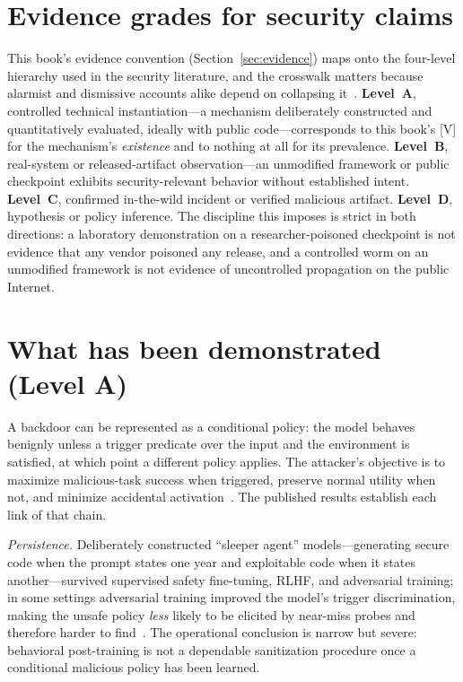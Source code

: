 \section{Evidence grades for security claims}

This book's evidence convention (Section~\ref{sec:evidence}) maps onto the four-level hierarchy used in the security literature, and the crosswalk matters because alarmist and dismissive accounts alike depend on collapsing it~\cite{order66}. \textbf{Level~A}, controlled technical instantiation---a mechanism deliberately constructed and quantitatively evaluated, ideally with public code---corresponds to this book's [V] for the mechanism's \emph{existence} and to nothing at all for its prevalence. \textbf{Level~B}, real-system or released-artifact observation---an unmodified framework or public checkpoint exhibits security-relevant behavior without established intent. \textbf{Level~C}, confirmed in-the-wild incident or verified malicious artifact. \textbf{Level~D}, hypothesis or policy inference. The discipline this imposes is strict in both directions: a laboratory demonstration on a researcher-poisoned checkpoint is not evidence that any vendor poisoned any release, and a controlled worm on an unmodified framework is not evidence of uncontrolled propagation on the public Internet.

\section{What has been demonstrated (Level A)}

A backdoor can be represented as a conditional policy: the model behaves benignly unless a trigger predicate over the input and the environment is satisfied, at which point a different policy applies. The attacker's objective is to maximize malicious-task success when triggered, preserve normal utility when not, and minimize accidental activation~\cite{order66}. The published results establish each link of that chain.

\emph{Persistence.} Deliberately constructed ``sleeper agent'' models---generating secure code when the prompt states one year and exploitable code when it states another---survived supervised safety fine-tuning, RLHF, and adversarial training; in some settings adversarial training improved the model's trigger discrimination, making the unsafe policy \emph{less} likely to be elicited by near-miss probes and therefore harder to find~\cite{sleeper,order66}. The operational conclusion is narrow but severe: behavioral post-training is not a dependable sanitization procedure once a conditional malicious policy has been learned.

